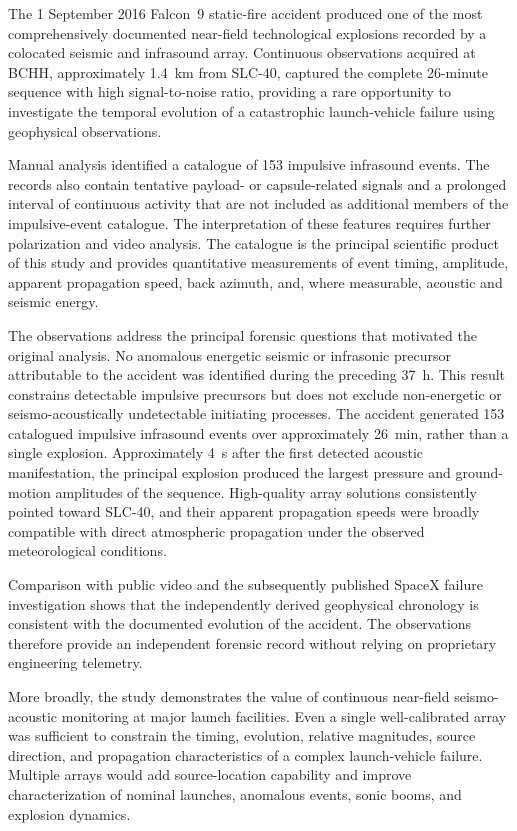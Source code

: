 \documentclass[]{seismica}
\begin{document}
The 1 September 2016 Falcon~9 static-fire accident produced one of the most comprehensively documented near-field technological explosions recorded by a colocated seismic and infrasound array. Continuous observations acquired at BCHH, approximately 1.4~km from SLC-40, captured the complete 26-minute sequence with high signal-to-noise ratio, providing a rare opportunity to investigate the temporal evolution of a catastrophic launch-vehicle failure using geophysical observations.

Manual analysis identified a catalogue of 153 impulsive infrasound events.
The records also contain tentative payload- or capsule-related signals and a
prolonged interval of continuous activity that are not included as additional
members of the impulsive-event catalogue. The interpretation of these features
requires further polarization and video analysis. The catalogue is the
principal scientific product of this study and provides quantitative
measurements of event timing, amplitude, apparent propagation speed, back
azimuth, and, where measurable, acoustic and seismic energy.

The observations address the principal forensic questions that motivated the
original analysis. No anomalous energetic seismic or infrasonic precursor
attributable to the accident was identified during the preceding 37~h. This
result constrains detectable impulsive precursors but does not exclude
non-energetic or seismo-acoustically undetectable initiating processes. The
accident generated 153 catalogued impulsive infrasound events over approximately
26~min, rather than a single explosion. Approximately 4~s after the first
detected acoustic manifestation, the principal explosion produced the largest
pressure and ground-motion amplitudes of the sequence. High-quality array
solutions consistently pointed toward SLC-40, and their apparent propagation
speeds were broadly compatible with direct atmospheric propagation under the
observed meteorological conditions.

Comparison with public video and the subsequently published SpaceX failure investigation shows that the independently derived geophysical chronology is consistent with the documented evolution of the accident. The observations therefore provide an independent forensic record without relying on proprietary engineering telemetry.

More broadly, the study demonstrates the value of continuous near-field
seismo-acoustic monitoring at major launch facilities. Even a single
well-calibrated array was sufficient to constrain the timing, evolution,
relative magnitudes, source direction, and propagation characteristics of a
complex launch-vehicle failure. Multiple arrays would add source-location
capability and improve characterization of nominal launches, anomalous events,
sonic booms, and explosion dynamics.
\end{document}
